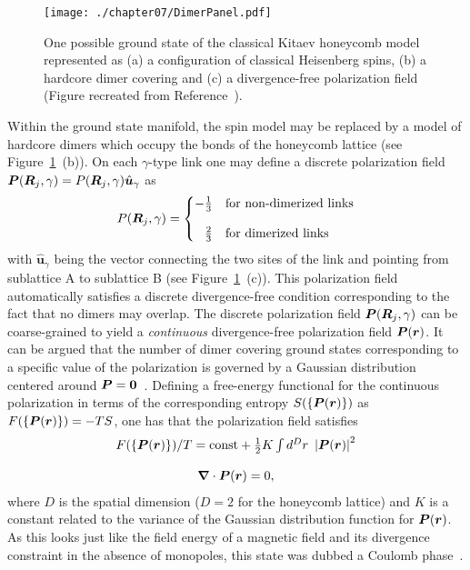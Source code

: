 %
\begin{figure}[tb]
	\centering
	\texttt{[image: ./chapter07/DimerPanel.pdf]}
	\caption{
		One possible ground state of the classical Kitaev honeycomb model represented as (a) a configuration of classical Heisenberg spins, (b) a hardcore dimer covering and (c) a divergence-free polarization field (Figure recreated from Reference~\cite{SelaPRB2014}).
	}
	\label{fig:chapter07_DimerPanel}
\end{figure}
%
Within the ground state manifold, the spin model may be replaced by a model of hardcore dimers which occupy the bonds of the honeycomb lattice (see Figure~\ref{fig:chapter07_DimerPanel}~(b)).
On each $\gamma$-type link one may define a discrete polarization field $\bm{P}(\bm{R}_j, \gamma) = P(\bm{R}_j, \gamma) \hat{\bm{u}}_{\gamma}$ as
%
\begin{equation}
	P(\bR_j, \gamma) = \left\{\begin{matrix*}[l]
		-\frac{1}{3} 				& \text{for non-dimerized links} \\
		\\
		\phantom{-}\frac{2}{3}		& \text{for dimerized links}
	\end{matrix*}\right.
\end{equation}
%
with $\hat{\bm{u}}_{\gamma}$ being the vector connecting the two sites of the link and pointing from sublattice A to sublattice B (see Figure~\ref{fig:chapter07_DimerPanel}~(c)).
This polarization field automatically satisfies a discrete divergence-free condition corresponding to the fact that no dimers may overlap.
The discrete polarization field $\bm{P}(\bm{R}_j, \gamma)$ can be coarse-grained to yield a \textit{continuous} divergence-free polarization field $\bm{P}(\bm{r})$.
It can be argued that the number of dimer covering ground states corresponding to a specific value of the polarization is governed by a Gaussian distribution centered around $\bm{P} = \bm{0}$~\cite{HenleyARCMP2010}.
Defining a free-energy functional for the continuous polarization in terms of the corresponding entropy $S(\{\bm{P}(\bm{r})\})$ as $F(\{\bm{P}(\bm{r})\}) = -T S$, one has that the polarization field satisfies
%
\begin{equation}
	\begin{matrix*}[c]
		F(\{\bP(\br)\})/T = {\rm const} + \frac{1}{2} K \int d^Dr~ \abs{\bP(\br)}^2 \\
		\\
		\bm{\nabla} \cdot \bP(\br) = 0,
	\end{matrix*}
\end{equation}
%
where $D$ is the spatial dimension ($D=2$ for the honeycomb lattice) and $K$ is a constant related to the variance of the Gaussian distribution function for $\bm{P}(\bm{r})$.
As this looks just like the field energy of a magnetic field and its divergence constraint in the absence of monopoles, this state was dubbed a Coulomb phase~\cite{HenleyARCMP2010}.

